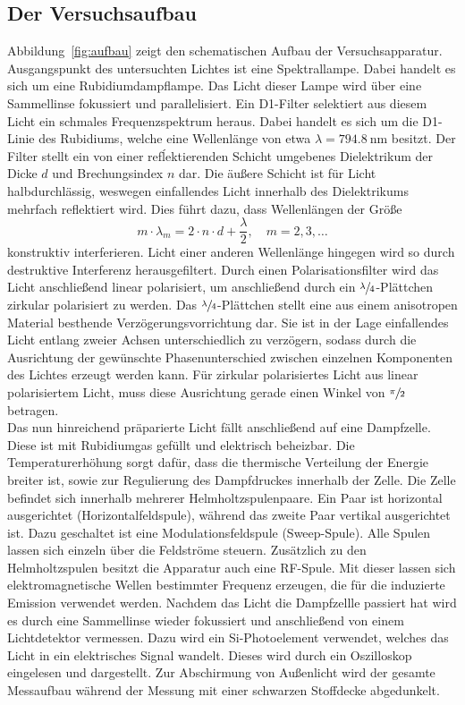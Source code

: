 \documentclass[
  bibliography=totoc,     %
  captions=tableheading,  %
  titlepage=firstiscover, %
]{scrartcl}
\begin{document}
\subsection{Der Versuchsaufbau}
Abbildung~\ref{fig:aufbau} zeigt den schematischen Aufbau der Versuchsapparatur.
Ausgangspunkt des untersuchten Lichtes ist eine Spektrallampe. Dabei handelt es
sich um eine Rubidiumdampflampe. Das Licht dieser Lampe wird über eine
Sammellinse fokussiert und parallelisiert. Ein D1-Filter selektiert aus diesem
Licht ein schmales Frequenzspektrum heraus. Dabei handelt es sich um die
D1-Linie des Rubidiums, welche eine Wellenlänge von etwa
$\lambda=\SI{794.8}{\nano\metre}$ besitzt. Der Filter stellt ein von einer
refĺektierenden Schicht umgebenes Dielektrikum der Dicke $d$ und
Brechungsindex $n$ dar. Die äußere Schicht ist für Licht halbdurchlässig,
weswegen einfallendes Licht innerhalb des Dielektrikums mehrfach reflektiert
wird. Dies führt dazu, dass Wellenlängen der Größe
%
\begin{equation}
  m\cdot\lambda_m=2\cdot n\cdot d+\frac{\lambda}{2}, \quad m=2,3,\ldots
\end{equation}
%
konstruktiv interferieren. Licht einer anderen Wellenlänge hingegen wird so
durch destruktive Interferenz herausgefiltert. Durch einen Polarisationsfilter
wird das Licht anschließend linear polarisiert, um anschließend durch ein
$\sfrac{\lambda}{4}$-Plättchen zirkular polarisiert zu werden. Das
$\sfrac{\lambda}{4}$-Plättchen stellt eine aus einem anisotropen Material
besthende Verzögerungsvorrichtung dar. Sie ist in der Lage einfallendes Licht
entlang zweier Achsen unterschiedlich zu verzögern, sodass durch die Ausrichtung
der gewünschte Phasenunterschied zwischen einzelnen Komponenten des Lichtes
erzeugt werden kann. Für zirkular polarisiertes Licht aus linear polarisiertem Licht,
muss diese Ausrichtung gerade einen Winkel von $\sfrac{\pi}{2}$ betragen. \\
Das nun hinreichend präparierte Licht fällt anschließend auf eine Dampfzelle.
Diese ist mit Rubidiumgas gefüllt und elektrisch beheizbar. Die Temperaturerhöhung
sorgt dafür, dass die thermische Verteilung der Energie breiter ist, sowie zur
Regulierung des Dampfdruckes innerhalb der Zelle. Die Zelle befindet sich
innerhalb mehrerer Helmholtzspulenpaare. Ein Paar ist horizontal ausgerichtet
(Horizontalfeldspule), während das zweite Paar vertikal ausgerichtet ist. Dazu
geschaltet ist eine Modulationsfeldspule (Sweep-Spule). Alle Spulen lassen sich
einzeln über die Feldströme steuern. Zusätzlich zu den Helmholtzspulen besitzt
die Apparatur auch eine RF-Spule. Mit dieser lassen sich elektromagnetische Wellen
bestimmter Frequenz erzeugen, die für die induzierte Emission verwendet werden.
Nachdem das Licht die Dampfzellle passiert hat wird es durch eine Sammellinse
wieder fokussiert und anschließend von einem Lichtdetektor vermessen.
Dazu wird ein Si-Photoelement verwendet, welches das Licht in ein elektrisches
Signal wandelt. Dieses wird durch ein Oszilloskop eingelesen und dargestellt.
Zur Abschirmung von Außenlicht wird der gesamte Messaufbau während der Messung
mit einer schwarzen Stoffdecke abgedunkelt.
\clearpage
\end{document}
